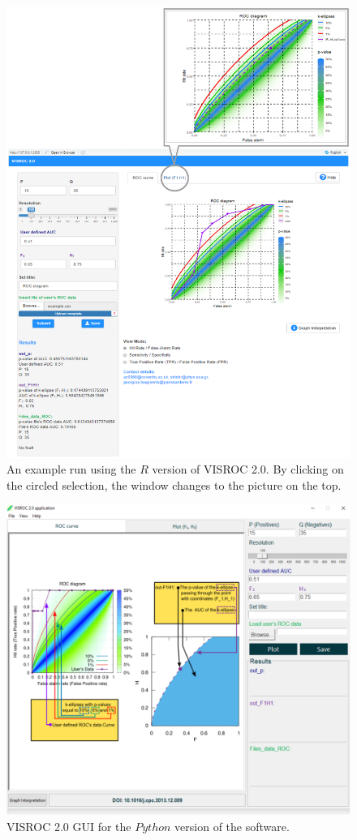 \documentclass[preprint,12pt]{elsarticle}
\begin{document}
\begin{figure}
\includegraphics[scale=0.55]{Figure2.eps}
\caption{An example run using the $R$ version of VISROC 2.0. By clicking on the circled selection, the window changes to the picture on the top.}\label{fig:2}
\end{figure}

\begin{figure}
\includegraphics[scale=0.6]{Figure3.eps}
\caption{VISROC 2.0 GUI for the $Python$ version of the software.}\label{fig:3}
\end{figure}
\end{document}
